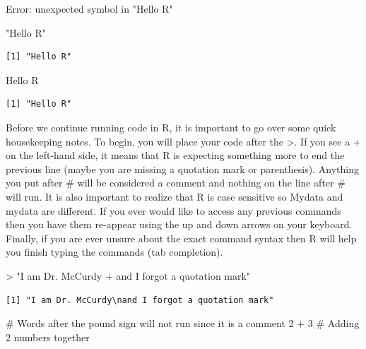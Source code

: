 \documentclass[
  letterpaper,
  DIV=11,
  numbers=noendperiod]{scrreprt}
\newenvironment{Shaded}{\begin{snugshade}}{\end{snugshade}}
\newcommand{\CommentTok}[1]{\textcolor[rgb]{0.37,0.37,0.37}{#1}}
\newcommand{\DecValTok}[1]{\textcolor[rgb]{0.68,0.00,0.00}{#1}}
\newcommand{\SpecialCharTok}[1]{\textcolor[rgb]{0.37,0.37,0.37}{#1}}
\newcommand{\StringTok}[1]{\textcolor[rgb]{0.13,0.47,0.30}{#1}}
\begin{document}
{Error: unexpected symbol in "Hello R"}

\begin{Shaded}
\begin{Highlighting}[]
\StringTok{"Hello R"}
\end{Highlighting}
\end{Shaded}

\begin{verbatim}
[1] "Hello R"
\end{verbatim}

\begin{Shaded}
\begin{Highlighting}[]
\StringTok{\textquotesingle{}Hello R\textquotesingle{}}
\end{Highlighting}
\end{Shaded}

\begin{verbatim}
[1] "Hello R"
\end{verbatim}

Before we continue running code in R, it is important to go over some
quick housekeeping notes. To begin, you will place your code after the
\textgreater. If you see a + on the left-hand side, it means that R is
expecting something more to end the previous line (maybe you are missing
a quotation mark or parenthesis). Anything you put after \# will be
considered a comment and nothing on the line after \# will run. It is
also important to realize that R is case sensitive so Mydata and mydata
are different. If you ever would like to access any previous commands
then you have them re-appear using the up and down arrows on your
keyboard. Finally, if you are ever unsure about the exact command syntax
then R will help you finish typing the commands (tab completion).

\begin{Shaded}
\begin{Highlighting}[]
\SpecialCharTok{\textgreater{}} \StringTok{"I am Dr. McCurdy}
\StringTok{+ and I forgot a quotation mark"}
\end{Highlighting}
\end{Shaded}

\begin{verbatim}
[1] "I am Dr. McCurdy\nand I forgot a quotation mark"
\end{verbatim}

\begin{Shaded}
\begin{Highlighting}[]
\CommentTok{\# Words after the pound sign will not run since it is a comment}
\DecValTok{2} \SpecialCharTok{+} \DecValTok{3} \CommentTok{\# Adding 2 numbers together}
\end{Highlighting}
\end{Shaded}
\end{document}
